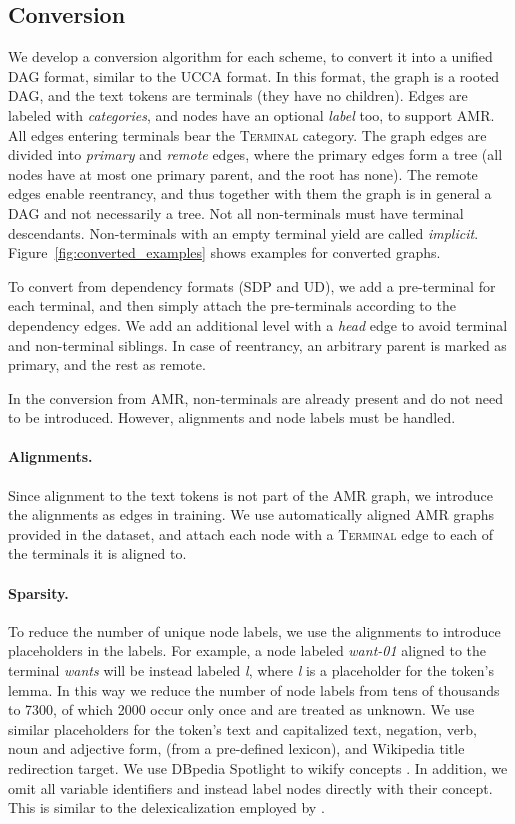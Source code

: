 \documentclass[11pt,a4paper]{article}
\begin{document}
\subsection{Conversion}\label{sec:conversion}

We develop a conversion algorithm for each scheme,
to convert it into a unified DAG format, similar to the UCCA format.
In this format, the graph is a rooted DAG, and the text tokens are terminals
(they have no children).
Edges are labeled with \textit{categories}, and
nodes have an optional \textit{label} too, to support AMR.
All edges entering terminals bear the \textsc{Terminal} category.
The graph edges are divided into \textit{primary} and \textit{remote} edges,
where the primary edges form a tree (all nodes have at most one primary parent,
and the root has none).
The remote edges enable reentrancy, and thus together with them the graph
is in general a DAG and not necessarily a tree.
Not all non-terminals must have terminal descendants.
Non-terminals with an empty terminal yield are called \textit{implicit}.
Figure~\ref{fig:converted_examples} shows examples for converted graphs.

To convert from dependency formats (SDP and UD), we add a pre-terminal for each terminal,
and then simply attach the pre-terminals according to the dependency edges.
We add an additional level with a \textit{head} edge to avoid terminal and non-terminal siblings.
In case of reentrancy, an arbitrary parent is marked as primary, and the rest as remote.

In the conversion from AMR, non-terminals are already present and do not need to be introduced.
However, alignments and node labels must be handled.

\paragraph{Alignments.}
Since alignment to the text tokens is not part of the AMR graph,
we introduce the alignments as edges in training.
We use automatically aligned AMR graphs provided in the dataset,
and attach each node with a \textsc{Terminal} edge to each of the terminals it is aligned to.

\paragraph{Sparsity.}
To reduce the number of unique node labels, we use the alignments to introduce
placeholders in the labels.
For example, a node labeled \textit{want-01} aligned to the terminal \textit{wants} will
be instead labeled \textit{\textlangle l},
where \textit{\textlangle l\textrangle} is a placeholder for the token's lemma.
In this way we reduce the number of node labels from tens of thousands to 7300,
of which 2000 occur only once and are treated as unknown.
We use similar placeholders for the token's text and capitalized text,
negation, verb, noun and adjective form,
(from a pre-defined lexicon), and Wikipedia title redirection target.
We use DBpedia Spotlight to wikify concepts \cite{isem2013daiber}.
In addition, we omit all variable identifiers and instead label nodes directly with their concept.
This is similar to the delexicalization employed by \citet{buys2017oxford}.
\end{document}
